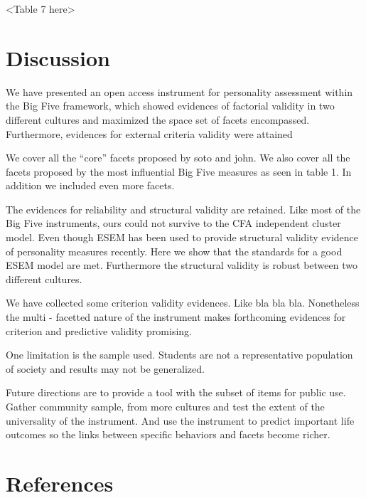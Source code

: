 \documentclass[man]{apa6}
\theoremstyle{definition}
\theoremstyle{definition}
\theoremstyle{definition}
\theoremstyle{remark}
\begin{document}
\vspace{5mm}

\textless{}Table 7 here\textgreater{}

\vspace{5mm}

\hypertarget{discussion}{%
\section{Discussion}\label{discussion}}

We have presented an open access instrument for personality assessment
within the Big Five framework, which showed evidences of factorial
validity in two different cultures and maximized the space set of facets
encompassed. Furthermore, evidences for external criteria validity were
attained

We cover all the \enquote{core} facets proposed by soto and john. We
also cover all the facets proposed by the most influential Big Five
measures as seen in table 1. In addition we included even more facets.

The evidences for reliability and structural validity are retained. Like
most of the Big Five instruments, ours could not survive to the CFA
independent cluster model. Even though ESEM has been used to provide
structural validity evidence of personality measures recently. Here we
show that the standards for a good ESEM model are met. Furthermore the
structural validity is robust between two different cultures.

We have collected some criterion validity evidences. Like bla bla bla.
Nonetheless the multi - facetted nature of the instrument makes
forthcoming evidences for criterion and predictive validity promising.

One limitation is the sample used. Students are not a representative
population of society and results may not be generalized.

Future directions are to provide a tool with the subset of items for
public use. Gather community sample, from more cultures and test the
extent of the universality of the instrument. And use the instrument to
predict important life outcomes so the links between specific behaviors
and facets become richer.

\newpage

\hypertarget{references}{%
\section{References}\label{references}}
\end{document}
